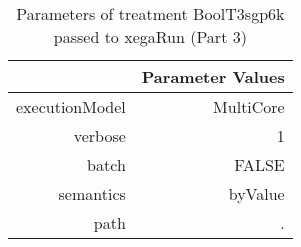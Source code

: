 \begin{table}[ht]
\centering
\begin{tabular}{rr}
  \hline
 & Parameter Values \\ 
  \hline
executionModel & MultiCore \\ 
  verbose & 1 \\ 
  batch & FALSE \\ 
  semantics & byValue \\ 
  path & . \\ 
   \hline
\end{tabular}
\caption{ Parameters of treatment BoolT3sgp6k passed to xegaRun
 (Part 3)} 
\end{table}
